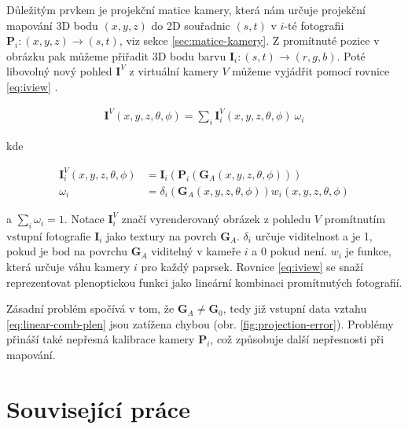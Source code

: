 \documentclass[11pt,twoside,a4paper]{book}
\begin{document}
Důležitým prvkem je projekční matice kamery, která nám určuje projekční mapování 3D bodu $(x, y, z)$ do 2D souřadnic $(s, t)$ v $i$-té fotografii  $\textbf{P}_i: (x, y, z) \to (s, t)$, viz sekce \ref{sec:matice-kamery}.  Z promítnuté pozice v obrázku pak můžeme přiřadit 3D bodu barvu $\textbf{I}_i : (s, t) \to (r, g, b)$. Poté libovolný nový pohled $\textbf{I}^V$ z virtuální kamery $V$ můžeme vyjádřit pomocí rovnice \ref{eq:iview} \cite{floating-textures}.

\begin{align}
\label{eq:iview}
\textbf{I}^V(x, y, z, \theta, \phi) = \sum_{i} \textbf{I}_{i}^{V}(x, y, z, \theta, \phi)~\omega_i
\end{align}

\noindent kde

\begin{align}
\label{eq:linear-comb-plen}
\textbf{I}_{i}^{V}(x, y, z, \theta, \phi) &=\textbf{I}_{i}(\textbf{P}_{i}(\textbf{G}_A(x, y, z, \theta, \phi)))\\
\label{eq:linear-weighting}
 \omega_i &= \delta_i(\textbf{G}_A(x, y, z, \theta, \phi)) w_i(x, y, z, \theta, \phi)
\end{align}

\noindent a $\sum_i \omega_i = 1$. Notace $ \textbf{I}_{i}^{V}$ značí vyrenderovaný obrázek z pohledu $V$ promítnutím vstupní fotografie  $\textbf{I}_{i}$ jako textury na povrch  $\textbf{G}_A$. $\delta_i$ určuje viditelnost a je 1, pokud je bod na povrchu $\textbf{G}_A$ viditelný v kameře $i$ a 0 pokud není. $w_i$ je funkce, která určuje váhu kamery $i$ pro každý paprsek. Rovnice \ref{eq:iview} se snaží reprezentovat plenoptickou funkci jako lineární kombinaci promítnutých fotografií.

Zásadní problém spočívá v tom, že $\textbf{G}_A \neq \textbf{G}_0$, tedy již vstupní data vztahu \ref{eq:linear-comb-plen} jsou zatížena chybou (obr. \ref{fig:projection-error}). Problémy přináší také nepřesná kalibrace kamery $\textbf{P}_i$, což způsobuje další nepřesnosti při mapování.

\section{Související práce}
\label{sec:related}
\end{document}
